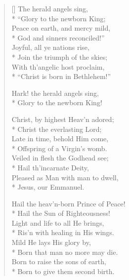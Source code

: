\newHymn
{}

\begin{verse}[\versewidth]
 The herald angels sing,\\*
``Glory to the newborn King;\\
Peace on earth, and mercy mild,\\*
God and sinners reconciled!''\\
Joyful, all ye nations rise,\\*
Join the triumph of the skies;\\
With th'angelic host proclaim,\\*
``Christ is born in Bethlehem!''

\begin{indentedVerse}
\vin Hark! the herald angels sing,\\*
\vin Glory to the newborn King!
\end{indentedVerse}

Christ, by highest Heav’n adored;\\*
Christ the everlasting Lord;\\
Late in time, behold Him come,\\*
Offspring of a Virgin's womb.\\
Veiled in flesh the Godhead see;\\*
Hail th'incarnate Deity,\\
Pleased as Man with man to dwell,\\*
Jesus, our Emmanuel.


Hail the heav'n-born Prince of Peace!\\*
Hail the Sun of Righteousness!\\
Light and life to all He brings,\\*
Ris'n with healing in His wings.\\
Mild He lays His glory by,\\*
Born that man no more may die.\\
Born to raise the sons of earth,\\*
Born to give them second birth.



\end{verse}


